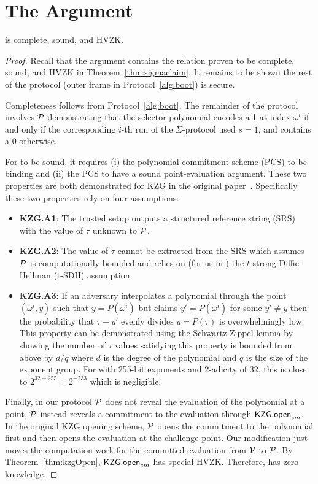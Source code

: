 
\section{The \bootstrap Argument}

\begin{claim}
\label{thm:keys}
\bootstrap is complete, sound, and HVZK.
\end{claim}

\begin{proof}
Recall that the \bootstrap argument contains the relation proven to be complete, sound, and HVZK in Theorem~\ref{thm:sigmaclaim}. It remains to be shown the rest of the protocol (outer frame in Protocol~\ref{alg:boot}) is secure.

Completeness follows from Protocol~\ref{alg:boot}. The remainder of the protocol involves $\mathcal{P}$ demonstrating that the selector polynomial encodes a 1 at index $\omega^i$ if and only if the corresponding $i$-th run of the $\Sigma$-protocol used $s=1$, and contains a 0 otherwise.

For \bootstrap to be sound, it requires (i) the polynomial commitment scheme (PCS) to be binding and (ii) the PCS to have a sound point-evaluation argument. These two properties are both demonstrated for KZG in the original paper~\cite{kzg}. Specifically these two properties rely on four assumptions:
\begin{itemize}
\item \textbf{KZG.A1}: The trusted setup outputs a structured reference string (SRS) with the value of $\tau$ unknown to $\mathcal{P}$. 
\item \textbf{KZG.A2}: The value of $\tau$ cannot be extracted from the SRS which assumes $\mathcal{P}$ is computationally bounded and relies on (for us in \bls) the $t$-strong Diffie-Hellman (t-SDH) assumption.
\item \textbf{KZG.A3}: If an adversary interpolates a polynomial through the point $(\omega^i,y)$ such that $y=P(\omega^i)$ but claims $y'=P(\omega^i)$ for some $y'\neq y$ then the probability that $\tau-y'$ evenly divides $y=P(\tau)$ is overwhelmingly low. This property can be demonstrated using the Schwartz-Zippel lemma by showing the number of $\tau$ values satisfying this property is bounded from above by $d$/$q$ where $d$ is the degree of the polynomial and $q$ is the size of the exponent group. For \bls with 255-bit exponents and 2-adicity of 32, this is close to $2^{32-255}=2^{-233}$ which is negligible.
\end{itemize}

Finally, in our protocol $\mathcal{P}$ does not reveal the evaluation of the polynomial at a point, $\mathcal{P}$ instead reveals a commitment to the evaluation through $\mathsf{KZG.open}_{cm}$. In the original KZG opening scheme, $\mathcal{P}$ opens the commitment to the polynomial first and then opens the evaluation at the challenge point. Our modification just moves the computation work for the committed evaluation from $\mathcal{V}$ to $\mathcal{P}$. By Theorem~\ref{thm:kzgOpen}, $\mathsf{KZG.open}_{cm}$ has special HVZK. Therefore, \bootstrap has zero knowledge.
\end{proof}


